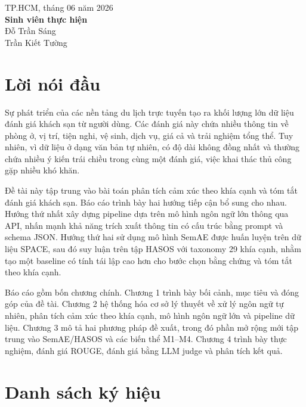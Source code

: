 \documentclass[12pt,a4paper]{report}
\newcommand{\cityname}{TP.HCM}
\newcommand{\reportyear}{2026}
\begin{document}
\begin{flushright}
\cityname, tháng 06 năm \reportyear\\
\textbf{Sinh viên thực hiện}\\
Đỗ Trần Sáng\\
Trần Kiết Tường
\end{flushright}

\clearpage

\chapter*{Lời nói đầu}

Sự phát triển của các nền tảng du lịch trực tuyến tạo ra khối lượng lớn dữ liệu đánh giá khách sạn từ người dùng. Các đánh giá này chứa nhiều thông tin về phòng ở, vị trí, tiện nghi, vệ sinh, dịch vụ, giá cả và trải nghiệm tổng thể. Tuy nhiên, vì dữ liệu ở dạng văn bản tự nhiên, có độ dài không đồng nhất và thường chứa nhiều ý kiến trái chiều trong cùng một đánh giá, việc khai thác thủ công gặp nhiều khó khăn.

Đề tài này tập trung vào bài toán phân tích cảm xúc theo khía cạnh và tóm tắt đánh giá khách sạn. Báo cáo trình bày hai hướng tiếp cận bổ sung cho nhau. Hướng thứ nhất xây dựng pipeline dựa trên mô hình ngôn ngữ lớn thông qua API, nhấn mạnh khả năng trích xuất thông tin có cấu trúc bằng prompt và schema JSON. Hướng thứ hai sử dụng mô hình SemAE được huấn luyện trên dữ liệu SPACE, sau đó suy luận trên tập HASOS với taxonomy 29 khía cạnh, nhằm tạo một baseline có tính tái lập cao hơn cho bước chọn bằng chứng và tóm tắt theo khía cạnh.

Báo cáo gồm bốn chương chính. Chương 1 trình bày bối cảnh, mục tiêu và đóng góp của đề tài. Chương 2 hệ thống hóa cơ sở lý thuyết về xử lý ngôn ngữ tự nhiên, phân tích cảm xúc theo khía cạnh, mô hình ngôn ngữ lớn và pipeline dữ liệu. Chương 3 mô tả hai phương pháp đề xuất, trong đó phần mở rộng mới tập trung vào SemAE/HASOS và các biến thể M1--M4. Chương 4 trình bày thực nghiệm, đánh giá ROUGE, đánh giá bằng LLM judge và phân tích kết quả.

\clearpage

\chapter*{Danh sách ký hiệu}
\end{document}
